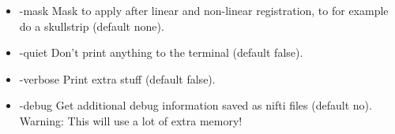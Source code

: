 \begin{itemize}

\item -mask                      
\newline \newline Mask to apply after linear and non-linear registration, to for example do a skullstrip (default none). 

\item -quiet 
\newline \newline Don't print anything to the terminal (default false). 

\item -verbose
\newline \newline Print extra stuff (default false).
 
\item -debug 
\newline \newline Get additional debug information saved as nifti files (default no). Warning: This will use a lot of extra memory! 

\end{itemize}


